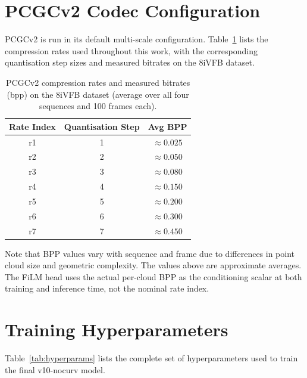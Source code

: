 \section{PCGCv2 Codec Configuration}
\label{app:codec-config}

PCGCv2 is run in its default multi-scale configuration.
Table~\ref{tab:codec-config} lists the compression rates used throughout
this work, with the corresponding quantisation step sizes and measured
bitrates on the 8iVFB dataset.

\begin{table}[h]
  \centering
  \caption{%
    PCGCv2 compression rates and measured bitrates (bpp) on the 8iVFB
    dataset (average over all four sequences and 100 frames each).
  }
  \label{tab:codec-config}
  \small
  \begin{tabular}{ccc}
    \toprule
    \textbf{Rate Index} & \textbf{Quantisation Step} & \textbf{Avg BPP} \\
    \midrule
    r1 & 1 & $\approx 0.025$ \\
    r2 & 2 & $\approx 0.050$ \\
    r3 & 3 & $\approx 0.080$ \\
    r4 & 4 & $\approx 0.150$ \\
    r5 & 5 & $\approx 0.200$ \\
    r6 & 6 & $\approx 0.300$ \\
    r7 & 7 & $\approx 0.450$ \\
    \bottomrule
  \end{tabular}
\end{table}

Note that BPP values vary with sequence and frame due to differences in
point cloud size and geometric complexity.
The values above are approximate averages.
The FiLM head uses the actual per-cloud BPP as the conditioning scalar
at both training and inference time, not the nominal rate index.

\section{Training Hyperparameters}
\label{app:hyperparams}

Table~\ref{tab:hyperparams} lists the complete set of hyperparameters used
to train the final v10-nocurv model.

